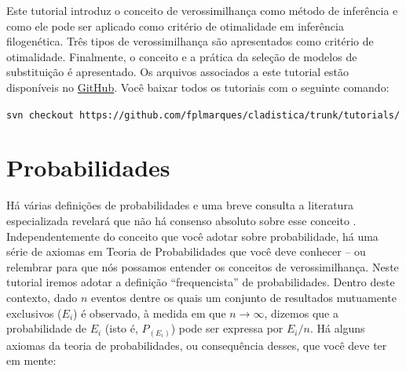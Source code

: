 \begin{refsection}
\renewcommand*{\finalnamedelim}{\addspace\&\space} %

Este tutorial introduz o conceito de verossimilhança como método de inferência e como ele pode ser aplicado como critério de otimalidade em inferência filogenética. Três tipos de verossimilhança são apresentados como critério de otimalidade. Finalmente, o conceito e a prática da seleção de modelos de substituição é apresentado. Os arquivos associados a este tutorial estão disponíveis no \href{https://github.com/fplmarques/cladistica/tree/main/tutorials/}{GitHub}. Você baixar todos os tutoriais com o seguinte comando:

\begin{center}
\small \texttt{svn checkout https://github.com/fplmarques/cladistica/trunk/tutorials/}\\
\end{center}


\newpage
\pagestyle{fancy} %
\newcommand{\A}{\textcolor{green}{\textbf{A}}}
\newcommand{\C}{\textcolor{blue}{\textbf{C}}}
\newcommand{\G}{\textcolor{gray}{\textbf{G}}}
\newcommand{\T}{\textcolor{red}{\textbf{T}}}
\newcommand{\gap}{\textcolor{black}{\textbf{-}}}


\section{Probabilidades}\label{tut12:probs}
Há várias definições de probabilidades e uma breve consulta a literatura especializada revelará que não há consenso absoluto sobre esse conceito \parencite[considere a leitura de][, anexo ao diretório do tutorial]{Thacker_2014}. Independentemente do conceito que você adotar sobre probabilidade, há uma série de axiomas em Teoria de Probabilidades que você deve conhecer -- ou relembrar para que nós possamos entender os conceitos de verossimilhança. Neste tutorial iremos adotar a definição ``frequencista'' de probabilidades. Dentro deste contexto, dado $n$ eventos dentre os quais um conjunto de resultados mutuamente exclusivos ($E_{i}$) é observado, à medida em que $n \rightarrow \infty$, dizemos que a probabilidade de $E_{i}$ (isto é, $P_{(E_{i})}$) pode ser expressa por $E_{i}/n$. Há alguns axiomas da teoria de probabilidades, ou consequência desses, que você deve ter em mente:


\end{refsection}
